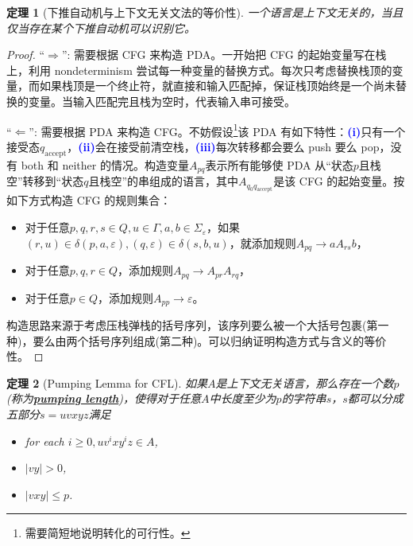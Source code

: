\documentclass[8pt]{article}
\theoremstyle{compact}
\newtheorem{theorem}{定理}
\def\obj#1{\textbf{\uline{#1}}}
\def\num#1{\textnormal{\textbf{\mbox{\textcolor{blue}{(#1)}}}}}
\def\le{\leqslant}
\def\ge{\geqslant}
\begin{document}
\begin{theorem}[下推自动机与上下文无关文法的等价性]
	一个语言是上下文无关的，当且仅当存在某个下推自动机可以识别它。
\end{theorem}
\begin{proof}
	“$\Rightarrow$”: 需要根据 CFG 来构造 PDA。一开始把 CFG 的起始变量写在栈上，利用 nondeterminism 尝试每一种变量的替换方式。每次只考虑替换栈顶的变量，而如果栈顶是一个终止符，就直接和输入匹配掉，保证栈顶始终是一个尚未替换的变量。当输入匹配完且栈为空时，代表输入串可接受。

	“$\Leftarrow$”: 需要根据 PDA 来构造 CFG。不妨假设\footnote{需要简短地说明转化的可行性。}该 PDA 有如下特性：\num{i}只有一个接受态$q_{\text{accept}}$，\num{ii}会在接受前清空栈，\num{iii}每次转移都会要么 push 要么 pop，没有 both 和 neither 的情况。构造变量$A_{pq}$表示所有能够使 PDA 从“状态$p$且栈空”转移到“状态$q$且栈空”的串组成的语言，其中$A_{q_0q_{\text{accept}}}$是该 CFG 的起始变量。按如下方式构造 CFG 的规则集合：
	\begin{itemize}
		\item 对于任意$p, q, r, s \in Q, u \in \Gamma, a, b \in \Sigma_{\varepsilon}$，如果$(r, u) \in \delta(p, a, \varepsilon), (q, \varepsilon) \in \delta(s, b, u)$，就添加规则$A_{pq} \to a A_{rs} b$，
		\item 对于任意$p, q, r \in Q$，添加规则$A_{pq} \to A_{pr}A_{rq}$，
		\item 对于任意$p \in Q$，添加规则$A_{pp} \to \varepsilon$。
	\end{itemize}

	构造思路来源于考虑压栈弹栈的括号序列，该序列要么被一个大括号包裹(第一种)，要么由两个括号序列组成(第二种)。可以归纳证明构造方式与含义的等价性。
\end{proof}
\begin{theorem}[Pumping Lemma for CFL]
	如果$A$是上下文无关语言，那么存在一个数$p$(称为\obj{pumping length})，使得对于任意$A$中长度至少为$p$的字符串$s$，$s$都可以分成五部分$s = uvxyz$满足
	\begin{itemize}
		\item for each $i \ge 0, uv^ixy^iz \in A$,
		\item $|vy| > 0$,
		\item $|vxy| \le p$.
	\end{itemize}
\end{theorem}
\end{document}
